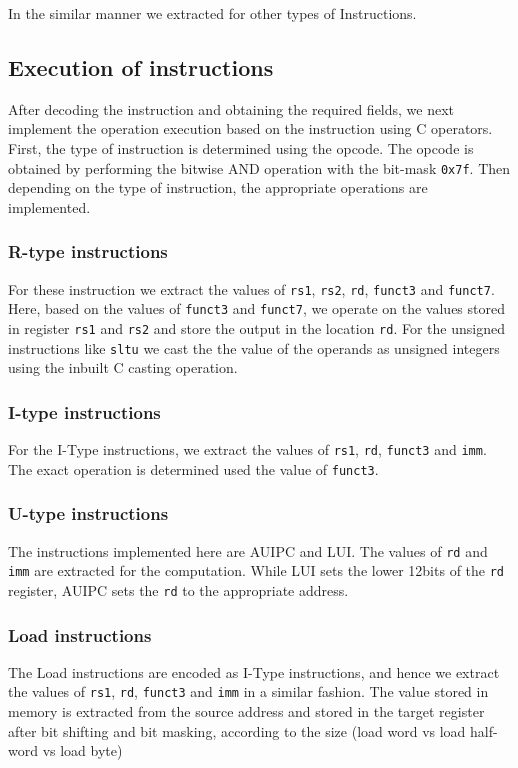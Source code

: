 In the similar manner we extracted for other types of Instructions.
\newpage

\subsection{Execution of instructions}

After decoding the instruction and obtaining the required fields, we next implement the operation execution based on the instruction using C operators. First, the type of instruction is determined using the opcode. The opcode is obtained by performing the bitwise AND operation with the bit-mask \texttt{0x7f}. Then depending on the type of instruction, the appropriate operations are implemented.

\subsubsection{R-type instructions}
For these instruction we extract the values of \texttt{rs1}, \texttt{rs2}, \texttt{rd}, \texttt{funct3} and \texttt{funct7}. Here, based on the values of \texttt{funct3} and \texttt{funct7}, we operate on the values stored in register \texttt{rs1} and \texttt{rs2} and store the output in the location \texttt{rd}. For the unsigned instructions like \texttt{sltu} we cast the the value of the operands as unsigned integers using the inbuilt C casting operation.

\subsubsection{I-type instructions}
For the I-Type instructions, we extract the values of \texttt{rs1}, \texttt{rd}, \texttt{funct3} and \texttt{imm}. The exact operation is determined used the value of \texttt{funct3}.

\subsubsection{U-type instructions}
The instructions implemented here are AUIPC and LUI. The values of \texttt{rd} and \texttt{imm} are extracted for the computation. While LUI sets the lower 12bits of the \texttt{rd} register, AUIPC sets the \texttt{rd} to the appropriate address.

\subsubsection{Load instructions}
The Load instructions are encoded as I-Type instructions, and hence we extract the values of \texttt{rs1}, \texttt{rd}, \texttt{funct3} and \texttt{imm} in a similar fashion. The value stored in memory is extracted from the source address and stored in the target register after bit shifting and bit masking, according to the size (load word vs load half-word vs load byte)

